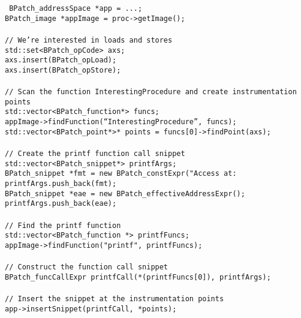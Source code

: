\texttt{
BPatch\_addressSpace *app = ...;\\
BPatch\_image *appImage = proc->getImage();\\
\\
// We’re interested in loads and stores\\
std::set<BPatch\_opCode> axs;\\
axs.insert(BPatch\_opLoad);\\
axs.insert(BPatch\_opStore);\\
\\
// Scan the function InterestingProcedure and create instrumentation points\\
std::vector<BPatch\_function*> funcs;\\
appImage->findFunction(“InterestingProcedure”, funcs);\\
std::vector<BPatch\_point*>* points = funcs[0]->findPoint(axs);\\
\\
// Create the printf function call snippet\\
std::vector<BPatch\_snippet*> printfArgs;\\
BPatch\_snippet *fmt = new BPatch\_constExpr("Access at: %
printfArgs.push\_back(fmt);\\
BPatch\_snippet *eae = new BPatch\_effectiveAddressExpr();\\
printfArgs.push\_back(eae);\\
\\
// Find the printf function\\
std::vector<BPatch\_function *> printfFuncs;\\
appImage->findFunction("printf", printfFuncs);\\
\\
// Construct the function call snippet\\
BPatch\_funcCallExpr printfCall(*(printfFuncs[0]), printfArgs);\\
\\
// Insert the snippet at the instrumentation points\\
app->insertSnippet(printfCall, *points);
}


